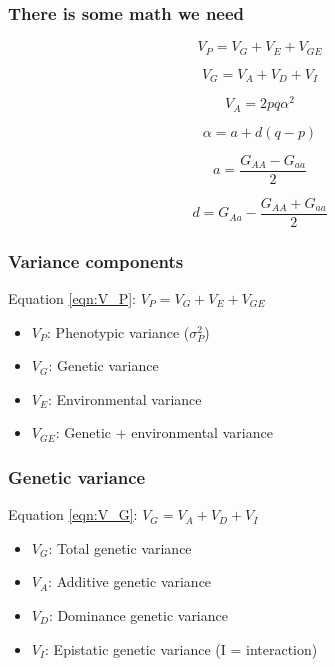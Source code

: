 \begin{frame}
\frametitle{There is some math we need}
\begin{block}{}
\begin{equation}
\label{eqn:V_P}
V_P = V_G + V_E + V_{GE}
\end{equation}

\begin{equation}
\label{eqn:V_G}
V_G = V_A + V_D + V_I
\end{equation}

\begin{equation}
\label{eqn:V_A}
V_A = 2pq\alpha^2
\end{equation}

\begin{equation}
\label{eqn:alpha}
\alpha = a + d(q-p)
\end{equation}

\begin{equation}
\label{eqn:a}
a = \frac{G_{AA}-G_{aa}}{2}
\end{equation}

\begin{equation}
\label{eqn:d}
d = G_{Aa} - \frac{G_{AA}+G_{aa}}{2}
\end{equation}

\end{block}{}
\end{frame}

\begin{frame}
\frametitle{Variance components}
\begin{block}{Equation \ref{eqn:V_P}: $V_P = V_G + V_E + V_{GE}$}
\begin{itemize}
\item{$V_P$: Phenotypic variance ($\sigma^2_P$)}
\item{$V_G$: Genetic variance}
\item{$V_E$: Environmental variance}
\item{$V_{GE}$: Genetic + environmental variance}
\end{itemize}
\end{block}
\end{frame}

\begin{frame}
\frametitle{Genetic variance}
\begin{block}{Equation \ref{eqn:V_G}: $V_G = V_A + V_D + V_I$}
\begin{itemize}
\item{$V_G$: Total genetic variance}
\item{$V_A$: Additive genetic variance}
\item{$V_D$: Dominance genetic variance}
\item{$V_I$: Epistatic genetic variance (I = interaction)}
\end{itemize}
\end{block}
\end{frame}

